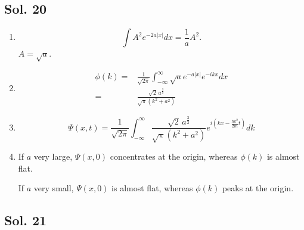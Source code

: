 \subsection*{Sol. 20}
\begin{enumerate}
    \item $$
    \int A^2e^{-2a|x|}dx = \frac{1}{a}A^2.
    $$
    $A=\sqrt{a}.$
    \item 
    \begin{align*}
        \phi(k)=&\frac{1}{\sqrt{2\pi}}\int_{-\infty}^{\infty}\sqrt{a}e^{-a|x|}e^{-ikx}dx\\
        =& \frac{\sqrt{2} \, a^{\frac{3}{2}}}{\sqrt{\pi} \left(k^{2} + a^{2}\right)}
        \end{align*}
        \item 
    $$
    \Psi(x,t) = \frac{1}{\sqrt{2\pi}}\int_{-\infty}^{\infty}
    \frac{\sqrt{2} \, a^{\frac{3}{2}}}{\sqrt{\pi} \left(k^{2} + a^{2}\right)}e^{i(kx-\frac{\hbar k^2}{2m}t)}dk
    $$
    \item 
    If $a$ very large, $\Psi(x,0)$ concentrates at the origin, whereas $\phi(k)$ is almost flat.

    If $a$ very small, $\Psi(x,0)$ is almost flat, whereas $\phi(k)$ peaks at the origin.
    
    
\end{enumerate}

\subsection*{Sol. 21}

